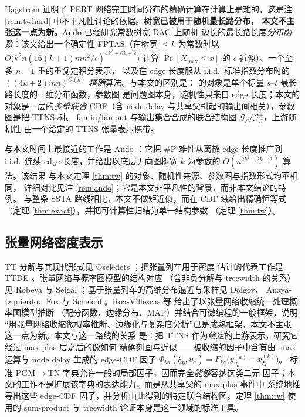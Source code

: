 \documentclass[a4paper,11pt]{article}
\theoremstyle{definition}
\newcommand{\1}{\mathbf 1}
\newcommand{\Gcal}{\mathcal G}
\begin{document}
Hagstrom \cite{Hagstrom1988} 证明了
PERT 网络完工时间分布的精确计算在计算上是难的，这是注
\ref{rem:twhard} 中不平凡性讨论的依据。\textbf{树宽已被用于随机最长路分布，
本文不主张这一点为新。}Ando \cite{Ando2019} 已经研究常数树宽 DAG 上随机
边长的最长路长度\emph{分布函数}：该文给出一个确定性 FPTAS（在树宽
$\le k$ 为常数时以
$O\!\bigl(k^2n(16(k+1)mn^2/\epsilon)^{4k^2+6k+2}\bigr)$ 计算
$\Pr[X_{\max}\le x]$ 的 $\epsilon$-近似）、一个至多 $n-1$ 重的重复定积分表示，
以及在 edge 长度服从 i.i.d.\ 标准指数分布时的
$((4k+2)mn)^{O(k)}$ \emph{精确}算法。与本文的区别是：
\cite{Ando2019} 的对象是单个标量 $s$--$t$ 最长路长度的一维分布函数，参数图
是问题图本身，随机性只来自 edge 长度；本文的对象是一层的\emph{多维联合}
CDF（含 node delay 与共享父引起的输出间相关），参数图是把 TTNS 树、
fan-in/fan-out 与输出集合合成的联合结构图 $\Gcal_S/\Gcal_S^{+}$，上游随机性
由一个给定的 TTNS 张量表示携带。

与本文时间上最接近的工作是 Ando
\cite{Ando2026}：它把 \#P-难性从离散 edge 长度推广到 i.i.d.\ 连续 edge
长度，并给出以底层无向图树宽 $k$ 为参数的 $O(n^{2k^2+2k+2})$ 算法。该结果
与本文定理 \ref{thm:tw} 的对象、随机性来源、参数图与指数形式均不相同，
详细对比见注 \ref{rem:ando}；它是本文非平凡性的背景，而非本文结论的特例。
与整条 SSTA 路线相比，本文不做矩近似，而在 CDF 域给出精确恒等式
（定理 \ref{thm:exact}），并把可计算性归结为单一结构参数
（定理 \ref{thm:tw}）。

\subsection{张量网络密度表示}

TT 分解与其现代形式见 Oseledets \cite{Oseledets2011}；把张量列车用于密度
估计的代表工作是 TTDE \cite{Novikov2021}。张量网络与概率图模型的结构对应
（含非负分解与 treewidth 的关系）见 Robeva 与 Seigal
\cite{RobevaSeigal2019}；基于张量列车的高维分布逼近与采样见 Dolgov、
Anaya-Izquierdo、Fox 与 Scheichl \cite{Dolgov2020}。Roa-Villescas 等
\cite{RoaVillescas2024} 给出了以张量网络收缩统一处理概率图模型推断
（配分函数、边缘分布、MAP）并结合可微编程的一般框架，说明
“用张量网络收缩做概率推断、边缘化与复杂度分析”已是成熟框架，本文不主张
这一点为新。本文与这一路线的关系
是：把 TTNS 作为\emph{给定}的上游表示，研究它经过 max-plus 层之后的像如何
精确刻画与近似——被收缩的因子中含有由 $\max$ 运算与 node delay 生成的
edge-CDF 因子
$\Phi_{ka}(\xi_k,\upsilon_a)=F_{ka}\bigl(y^{(a)}_{\upsilon_a}-x^{(k)}_{\xi_k}\bigr)$。
标准 PGM$\to$TN 字典允许一般的局部因子，因而完全\emph{能够}容纳这类二元
因子；本文的工作不是扩展该字典的表达能力，而是从共享父的 max-plus 事件中
系统地推导出这些 edge-CDF 因子，并分析由此得到的特定联合结构图。定理
\ref{thm:tw} 使用的 sum-product 与 treewidth 论证本身是这一领域的标准工具。
\end{document}
